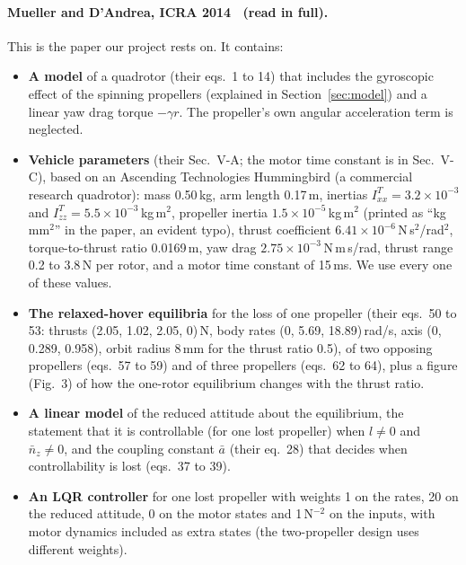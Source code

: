 \paragraph{Mueller and D'Andrea, ICRA 2014~\cite{mueller2014stability} (read in full).}
This is the paper our project rests on. It contains:
\begin{itemize}
  \item \textbf{A model} of a quadrotor (their eqs.~1 to 14) that includes the gyroscopic effect of the spinning propellers (explained in Section~\ref{sec:model}) and a linear yaw drag torque $-\gamma r$. The propeller's own angular acceleration term is neglected.
  \item \textbf{Vehicle parameters} (their Sec.~V-A; the motor time constant is in Sec.~V-C), based on an Ascending Technologies Hummingbird (a commercial research quadrotor): mass 0.50\,kg, arm length 0.17\,m, inertias $I^T_{xx}=3.2\times10^{-3}$ and $I^T_{zz}=5.5\times10^{-3}$\,kg\,m$^2$, propeller inertia $1.5\times10^{-5}$\,kg\,m$^2$ (printed as ``kg\,mm$^2$'' in the paper, an evident typo), thrust coefficient $6.41\times10^{-6}$\,N\,s$^2$/rad$^2$, torque-to-thrust ratio 0.0169\,m, yaw drag $2.75\times10^{-3}$\,N\,m\,s/rad, thrust range 0.2 to 3.8\,N per rotor, and a motor time constant of 15\,ms. We use every one of these values.
  \item \textbf{The relaxed-hover equilibria} for the loss of one propeller (their eqs.~50 to 53: thrusts (2.05, 1.02, 2.05, 0)\,N, body rates (0, 5.69, 18.89)\,rad/s, axis (0, 0.289, 0.958), orbit radius 8\,mm for the thrust ratio 0.5), of two opposing propellers (eqs.~57 to 59) and of three propellers (eqs.~62 to 64), plus a figure (Fig.~3) of how the one-rotor equilibrium changes with the thrust ratio.
  \item \textbf{A linear model} of the reduced attitude about the equilibrium, the statement that it is controllable (for one lost propeller) when $l\ne0$ and $\bar n_z\ne0$, and the coupling constant $\bar a$ (their eq.~28) that decides when controllability is lost (eqs.~37 to 39).
  \item \textbf{An LQR controller} for one lost propeller with weights 1 on the rates, 20 on the reduced attitude, 0 on the motor states and 1\,N$^{-2}$ on the inputs, with motor dynamics included as extra states (the two-propeller design uses different weights).

\end{itemize}
